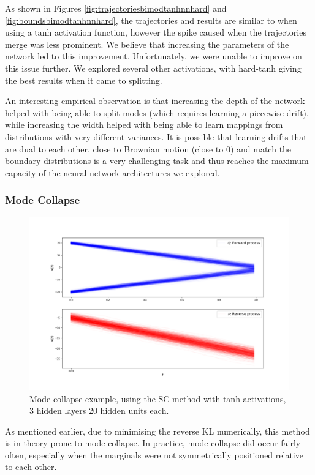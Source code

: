 \documentclass[a4paper,12pt,twoside,openright]{report}
\theoremstyle{definition}
\begin{document}
As shown in Figures \ref{fig:trajectoriesbimodtanhnnhard} and \ref{fig:boundsbimodtanhnnhard}, the trajectories and results are similar to when using a tanh activation function, however the spike caused when the trajectories merge was less prominent. We believe that increasing the parameters of the network led to this improvement. Unfortunately, we were unable to improve on this issue further.  We explored several other activations, with hard-tanh giving the best results when it came to splitting.

An interesting empirical observation is that increasing the depth of the network helped with being able to split modes (which requires learning a piecewise drift), while increasing the width helped with being able to learn mappings from distributions with very different  variances. It is possible that learning drifts that are dual to each other, close to Brownian motion (close to 0) and match the boundary distributions is a very challenging task and thus reaches the maximum capacity of the neural network architectures we explored.
\subsubsection{Mode Collapse}
\begin{figure}[t]
    \centering
    \includegraphics[scale=0.4,trim={2.3cm 1cm 2.5cm 0}, clip]{images/Control/mode_colapse_final_relu_trajectories.png}
    \caption{ Mode collapse example, using the SC method with tanh activations, 3 hidden layers 20 hidden units each.}
    \label{fig:trajectoriesmodecop}
\end{figure}
As mentioned earlier, due to minimising the reverse KL numerically, this method is in theory prone to mode collapse. In practice, mode collapse did occur fairly often, especially when the marginals were not symmetrically positioned relative to each other. 
\end{document}
